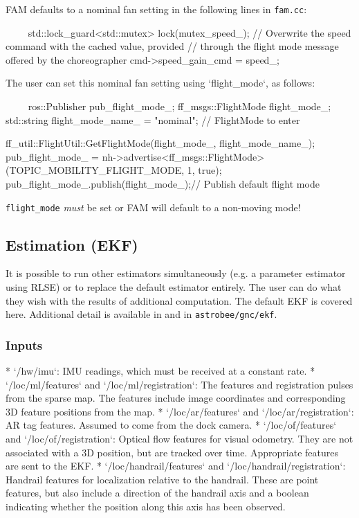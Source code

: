 \documentclass{article}
\begin{document}
FAM defaults to a nominal fan setting in the following lines in \texttt{fam.cc}:

\begin{markdown}
~~~~
 {
   std::lock_guard<std::mutex> lock(mutex_speed_);
   // Overwrite the speed command with the cached value, provided
   // through the flight mode message offered by the choreographer
   cmd->speed_gain_cmd = speed_;
}
 ~~~~
 
The user can set this nominal fan setting using `flight_mode`, as follows:

~~~~
ros::Publisher pub_flight_mode_;
ff_msgs::FlightMode flight_mode_;
std::string flight_mode_name_ = "nominal";  // FlightMode to enter

ff_util::FlightUtil::GetFlightMode(flight_mode_, flight_mode_name_);
pub_flight_mode_ = nh->advertise<ff_msgs::FlightMode>(TOPIC_MOBILITY_FLIGHT_MODE, 1, true);
pub_flight_mode_.publish(flight_mode_);// Publish default flight mode
~~~~
\end{markdown}

\noindent \texttt{flight\_mode} \textit{must} be set or FAM will default to a non-moving mode!

\subsection{Estimation (EKF)}

It is possible to run other estimators simultaneously (e.g. a parameter estimator using RLSE) or to replace the default estimator entirely. The user can do what they wish with the results of additional computation. The default EKF is covered here. Additional detail is available in \cite{Coltin2016a} and in \texttt{astrobee/gnc/ekf}.

\subsubsection{Inputs}
\begin{markdown}
* `/hw/imu`: IMU readings, which must be received at a constant rate.
* `/loc/ml/features` and `/loc/ml/registration`: The features and registration pulses from the sparse map. The features include image coordinates and corresponding 3D feature positions from the map.
* `/loc/ar/features` and `/loc/ar/registration`: AR tag features. Assumed to come from the dock camera.
* `/loc/of/features` and `/loc/of/registration`: Optical flow features for visual odometry. They are not associated with a 3D position, but are tracked over time. Appropriate features are sent to the EKF.
* `/loc/handrail/features` and `/loc/handrail/registration`: Handrail features for localization relative to the handrail. These are point features, but also include a direction of the handrail axis and a boolean indicating whether the position along this axis has been observed.
\end{markdown}
\end{document}
